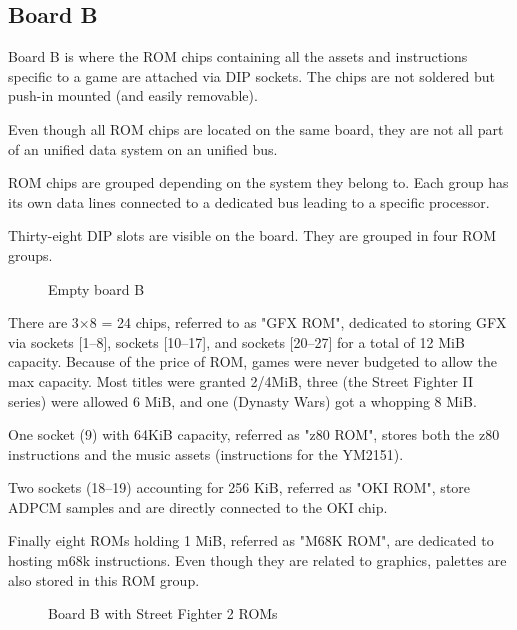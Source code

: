 \label{fig:boarda}

\label{fig:drawboarda}

\subsection{Board B}
   Board B is where the ROM chips containing all the assets and instructions specific to a game are attached via DIP sockets. The chips are not soldered but push-in mounted (and easily removable).

   Even though all ROM chips are located on the same board, they are not all part of an unified data system on an unified bus. 

   ROM chips are grouped depending on the system they belong to. Each group has its own data lines connected to a dedicated bus leading to a specific processor. 

   Thirty-eight DIP slots are visible on the board. They are grouped in four ROM groups. 

\vfill
\begin{figure}[!b] \label{boardb_no_chips}
  \caption*{Empty board B}
  \end{figure}
\pagebreak

   There are 3$\times$8 = 24 chips, referred to as "GFX ROM", dedicated to storing GFX via sockets [1--8], sockets [10--17], and sockets [20--27] for a total of 12 MiB capacity. Because of the price of ROM, games were never budgeted to allow the max capacity. Most titles were granted 2/4MiB, three (the Street Fighter II series) were allowed 6 MiB, and one (Dynasty Wars) got a whopping 8 MiB.

   One socket (9) with 64KiB capacity, referred as "z80 ROM", stores both the z80 instructions and the music assets (instructions for the YM2151). 

   Two sockets (18--19) accounting for 256 KiB, referred as "OKI ROM", store ADPCM samples and are directly connected to the OKI chip.

   Finally eight ROMs holding 1 MiB, referred as "M68K ROM", are dedicated to hosting m68k instructions. Even though they are related to graphics, palettes are also stored in this ROM group. 


\vfill
\begin{figure}[H]
  \caption*{Board B with Street Fighter 2 ROMs}
  \end{figure}
\pagebreak


